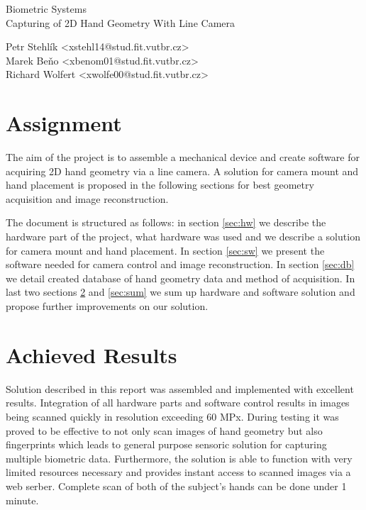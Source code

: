 \documentclass[11pt,a4paper]{article}
\begin{document}
\begin{center}
	\LARGE{Biometric Systems}\\
	\Large{Capturing of 2D Hand Geometry With Line Camera}
	\vspace{0.5cm}

    \begin{centering}
    \small{
        Petr Stehlík <xstehl14@stud.fit.vutbr.cz>\\
        Marek Beňo <xbenom01@stud.fit.vutbr.cz>\\
        Richard Wolfert <xwolfe00@stud.fit.vutbr.cz>\\
        }
    \end{centering}

	\vspace{0.2cm}

\end{center}

\section{Assignment}
The aim of the project is to assemble a mechanical device and create software for acquiring 2D hand geometry via a line camera.
A solution for camera mount and hand placement is proposed in the following sections for best geometry acquisition and image reconstruction.

The document is structured as follows: in section \ref{sec:hw} we describe the hardware part of the project, what hardware was used
and we describe a solution for camera mount and hand placement. In section \ref{sec:sw} we present the software needed for camera control and image reconstruction.
In section \ref{sec:db} we detail created database of hand geometry data and method of acquisition. In last two sections \ref{sec:res}
and \ref{sec:sum} we sum up hardware and software solution and propose further improvements on our solution.








\section{Achieved Results}
\label{sec:res}
Solution described in this report was assembled and implemented with excellent results. Integration of all hardware parts and software control results
in images being scanned quickly in resolution exceeding 60 MPx. During testing it was proved to be effective to not only scan images
of hand geometry but also fingerprints which leads to general purpose sensoric solution for capturing multiple biometric data. Furthermore,
the solution is able to function with very limited resources necessary and provides instant access to scanned images via a web serber. Complete scan of both of the subject's
hands can be done under 1 minute.
\end{document}
